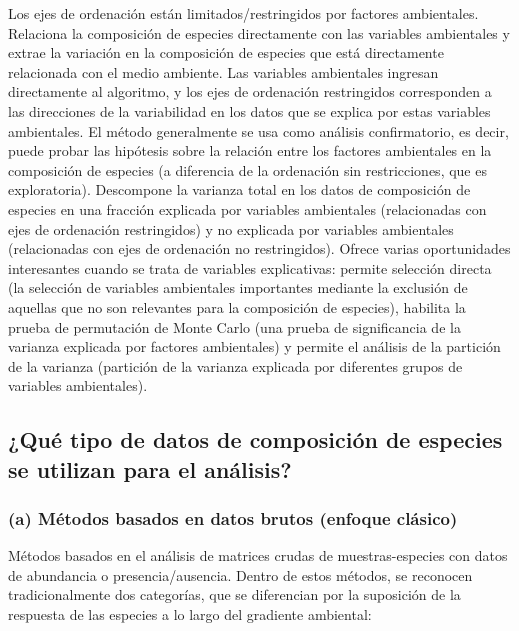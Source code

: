 \documentclass[
]{book}
\begin{document}
Los ejes de ordenación están limitados/restringidos por factores ambientales. Relaciona la composición de especies directamente con las variables ambientales y extrae la variación en la composición de especies que está directamente relacionada con el medio ambiente. Las variables ambientales ingresan directamente al algoritmo, y los ejes de ordenación restringidos corresponden a las direcciones de la variabilidad en los datos que se explica por estas variables ambientales. El método generalmente se usa como análisis confirmatorio, es decir, puede probar las hipótesis sobre la relación entre los factores ambientales en la composición de especies (a diferencia de la ordenación sin restricciones, que es exploratoria). Descompone la varianza total en los datos de composición de especies en una fracción explicada por variables ambientales (relacionadas con ejes de ordenación restringidos) y no explicada por variables ambientales (relacionadas con ejes de ordenación no restringidos). Ofrece varias oportunidades interesantes cuando se trata de variables explicativas: permite selección directa (la selección de variables ambientales importantes mediante la exclusión de aquellas que no son relevantes para la composición de especies), habilita la prueba de permutación de Monte Carlo (una prueba de significancia de la varianza explicada por factores ambientales) y permite el análisis de la partición de la varianza (partición de la varianza explicada por diferentes grupos de variables ambientales).

\hypertarget{quuxe9-tipo-de-datos-de-composiciuxf3n-de-especies-se-utilizan-para-el-anuxe1lisis}{%
\subsection{¿Qué tipo de datos de composición de especies se utilizan para el análisis?}\label{quuxe9-tipo-de-datos-de-composiciuxf3n-de-especies-se-utilizan-para-el-anuxe1lisis}}

\hypertarget{a-muxe9todos-basados-en-datos-brutos-enfoque-cluxe1sico}{%
\subsubsection{(a) Métodos basados en datos brutos (enfoque clásico)}\label{a-muxe9todos-basados-en-datos-brutos-enfoque-cluxe1sico}}

Métodos basados en el análisis de matrices crudas de muestras-especies con datos de abundancia o presencia/ausencia. Dentro de estos métodos, se reconocen tradicionalmente dos categorías, que se diferencian por la suposición de la respuesta de las especies a lo largo del gradiente ambiental:
\end{document}

